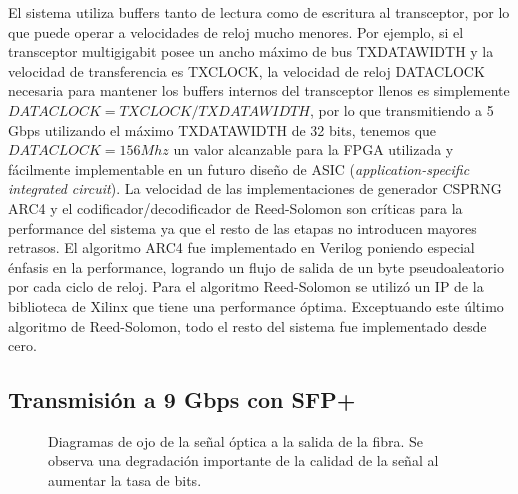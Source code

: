  

El sistema utiliza buffers tanto de lectura como de escritura al transceptor, por lo que puede operar a velocidades de reloj mucho menores. Por ejemplo, si el transceptor multigigabit posee un ancho máximo de bus TXDATAWIDTH y la velocidad de transferencia es TXCLOCK, la velocidad de reloj DATACLOCK necesaria para mantener los buffers internos del transceptor llenos es simplemente $DATACLOCK=TXCLOCK/TXDATAWIDTH$, por lo que transmitiendo a 5 Gbps utilizando el máximo TXDATAWIDTH de 32 bits, tenemos que $DATACLOCK=156Mhz$ un valor alcanzable para la FPGA utilizada y fácilmente implementable en un futuro diseño de ASIC (\textit{application-specific integrated circuit}).
La velocidad de las implementaciones de generador CSPRNG ARC4 y el codificador/decodificador de Reed-Solomon son críticas para la performance del sistema ya que el resto de las etapas no introducen mayores retrasos. El algoritmo ARC4 fue implementado en Verilog poniendo especial énfasis en la performance, logrando un flujo de salida de un byte pseudoaleatorio por cada ciclo de reloj. Para el algoritmo Reed-Solomon se utilizó un IP de la biblioteca de Xilinx que tiene una performance óptima. Exceptuando este último algoritmo de Reed-Solomon, todo el resto del sistema fue implementado desde cero.


\subsection{Transmisión a 9 Gbps con SFP+}

\begin{figure}[!t]
   \centering
   \qquad
   \qquad
  \caption {Diagramas de ojo de la señal óptica a la salida de la fibra. Se observa una degradación importante de la calidad de la señal al aumentar la tasa de bits.}
  \label{fig:ImgOjo}
\end{figure}


